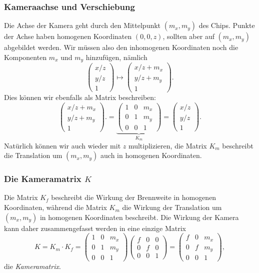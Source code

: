 \subsubsection{Kameraachse und Verschiebung}
Die Achse der Kamera geht durch den Mittelpunkt $(m_x,m_y)$ des Chips.
Punkte der Achse haben homogenen Koordinaten $(0,0,z)$, sollten aber
auf $(m_x,m_y)$ abgebildet werden.
Wir müssen also den inhomogenen Koordinaten noch die Komponenten
$m_x$ und $m_y$ hinzufügen, nämlich
\[
\begin{pmatrix} x/z \\ y/z \\ 1 \end{pmatrix}
\mapsto
\begin{pmatrix} x/z +m_x\\ y/z +m_y\\ 1 \end{pmatrix}.
\]
Dies können wir ebenfalls als Matrix beschreiben:
\[
\begin{pmatrix} x/z +m_x\\ y/z +m_y\\ 1 \end{pmatrix}.
=
\underbrace{
\begin{pmatrix}
1&0&m_x\\
0&1&m_y\\
0&0&1
\end{pmatrix}
}_{\displaystyle K_m}
=
\begin{pmatrix} x/z \\ y/z \\ 1 \end{pmatrix}.
\]
Natürlich können wir auch wieder mit $z$ multiplizieren, die Matrix
$K_m$ beschreibt die Translation um $(m_x,m_y)$ auch in homogenen
Koordinaten.

\subsubsection{Die Kameramatrix $K$}
Die Matrix $K_f$ beschreibt die Wirkung der Brennweite in homogenen
Koordinaten, während die Matrix $K_m$ die Wirkung der Translation um
$(m_x,m_y)$ in homogenen Koordinaten beschreibt.
Die Wirkung der Kamera kann daher zusammengefasst werden in eine einzige
Matrix
\[
K
=
K_m\cdot K_f
=
\begin{pmatrix}
1&0&m_x\\
0&1&m_y\\
0&0&1
\end{pmatrix}
\begin{pmatrix}
f&0&0\\
0&f&0\\
0&0&1
\end{pmatrix}
=
\begin{pmatrix}
f&0&m_x\\
0&f&m_y\\
0&0&1
\end{pmatrix},
\]
die {\em Kameramatrix}.
%





